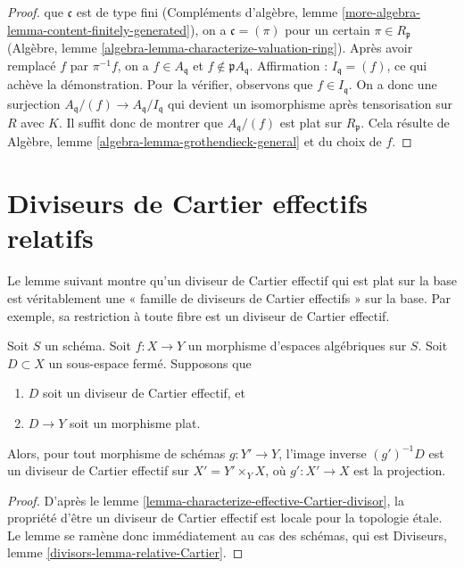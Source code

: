 \begin{proof}
que $\mathfrak c$ est de type fini
(Compléments d'algèbre, lemme \ref{more-algebra-lemma-content-finitely-generated}),
on a $\mathfrak c = (\pi)$ pour un certain $\pi \in R_\mathfrak p$
(Algèbre, lemme \ref{algebra-lemma-characterize-valuation-ring}).
Après avoir remplacé $f$ par $\pi^{-1}f$, on a $f \in A_\mathfrak q$
et $f \not \in \mathfrak pA_\mathfrak q$.
Affirmation : $I_\mathfrak q = (f)$, ce qui achève la démonstration.
Pour la vérifier, observons que $f \in I_\mathfrak q$.
On a donc une surjection $A_\mathfrak q/(f) \to A_\mathfrak q/I_\mathfrak q$
qui devient un isomorphisme après tensorisation sur $R$ avec $K$.
Il suffit donc de montrer que
$A_\mathfrak q/(f)$ est plat sur $R_\mathfrak p$.
Cela résulte de
Algèbre, lemme \ref{algebra-lemma-grothendieck-general}
et du choix de $f$.
\end{proof}









\section{Diviseurs de Cartier effectifs relatifs}
\label{section-effective-Cartier-morphisms}

\noindent
Le lemme suivant montre qu'un diviseur de Cartier effectif qui est
plat sur la base est véritablement une « famille de diviseurs de Cartier effectifs »
sur la base. Par exemple, sa restriction à toute fibre est un diviseur de
Cartier effectif.

\begin{lemma}
\label{lemma-relative-Cartier}
Soit $S$ un schéma. Soit $f : X \to Y$ un morphisme
d'espaces algébriques sur $S$. Soit $D \subset X$ un sous-espace fermé.
Supposons que
\begin{enumerate}
\item $D$ soit un diviseur de Cartier effectif, et
\item $D \to Y$ soit un morphisme plat.
\end{enumerate}
Alors, pour tout morphisme de schémas $g : Y' \to Y$, l'image inverse
$(g')^{-1}D$ est un diviseur de Cartier effectif sur $X' = Y' \times_Y X$,
où $g' : X' \to X$ est la projection.
\end{lemma}

\begin{proof}
D'après le lemme \ref{lemma-characterize-effective-Cartier-divisor},
la propriété d'être un diviseur de Cartier effectif est locale pour la topologie \'etale.
Le lemme se ramène donc immédiatement au cas des schémas,
qui est Diviseurs, lemme \ref{divisors-lemma-relative-Cartier}.
\end{proof}


